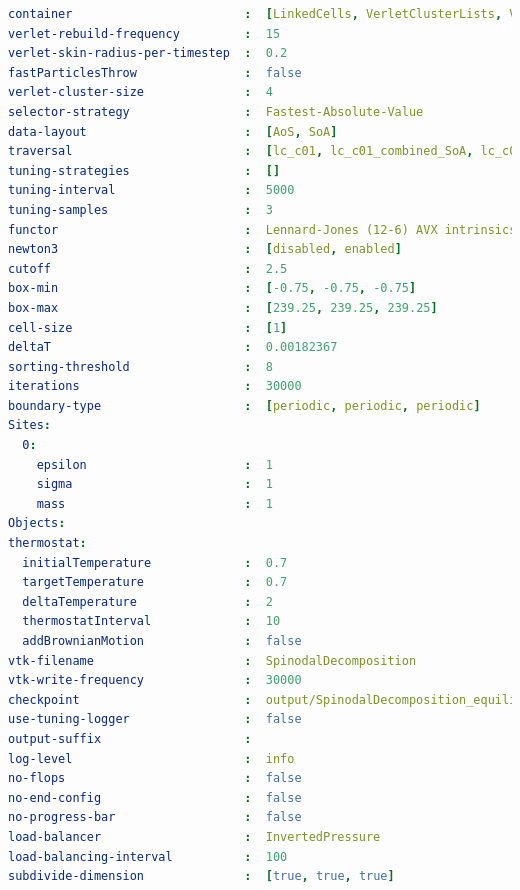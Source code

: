\begin{lstlisting}[language=yaml,basicstyle=\tiny,breaklines=true,  caption={spinodalDecomposition.yaml}, label={lst:spinodalDecomposition}]
container                        :  [LinkedCells, VerletClusterLists, VerletLists, VerletListsCells, PairwiseVerletLists]
verlet-rebuild-frequency         :  15
verlet-skin-radius-per-timestep  :  0.2
fastParticlesThrow               :  false
verlet-cluster-size              :  4
selector-strategy                :  Fastest-Absolute-Value
data-layout                      :  [AoS, SoA]
traversal                        :  [lc_c01, lc_c01_combined_SoA, lc_c04, lc_c04_HCP, lc_c04_combined_SoA, lc_c08, lc_c18, lc_sliced, lc_sliced_balanced, lc_sliced_c02, ot_c01, ot_c18, vcl_c01_balanced, vcl_c06, vcl_sliced, vcl_sliced_balanced, vcl_sliced_c02, vl_list_iteration, vlc_c01, vlc_c18, vlc_sliced, vlc_sliced_balanced, vlc_sliced_c02, vlp_c01, vlp_c18, vlp_sliced, vlp_sliced_balanced, vlp_sliced_c02, vlp_c08, vvl_as_built]
tuning-strategies                :  []
tuning-interval                  :  5000
tuning-samples                   :  3
functor                          :  Lennard-Jones (12-6) AVX intrinsics
newton3                          :  [disabled, enabled]
cutoff                           :  2.5
box-min                          :  [-0.75, -0.75, -0.75]
box-max                          :  [239.25, 239.25, 239.25]
cell-size                        :  [1]
deltaT                           :  0.00182367
sorting-threshold                :  8
iterations                       :  30000
boundary-type                    :  [periodic, periodic, periodic]
Sites:                           
  0:
    epsilon                      :  1
    sigma                        :  1
    mass                         :  1
Objects:                         
thermostat:
  initialTemperature             :  0.7
  targetTemperature              :  0.7
  deltaTemperature               :  2
  thermostatInterval             :  10
  addBrownianMotion              :  false
vtk-filename                     :  SpinodalDecomposition
vtk-write-frequency              :  30000
checkpoint                       :  output/SpinodalDecomposition_equilibration/SpinodalDecomposition_equilibration_10000.pvtu
use-tuning-logger                :  false
output-suffix                    :  
log-level                        :  info
no-flops                         :  false
no-end-config                    :  false
no-progress-bar                  :  false
load-balancer                    :  InvertedPressure
load-balancing-interval          :  100
subdivide-dimension              :  [true, true, true]
\end{lstlisting}

